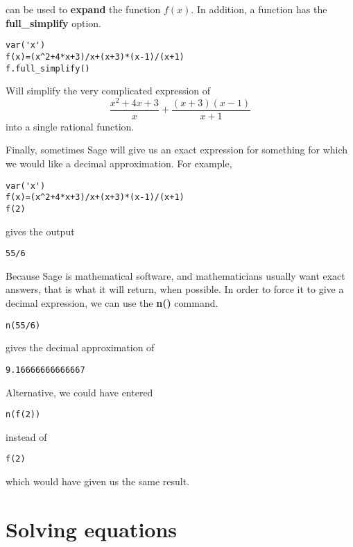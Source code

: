 can be used to \textbf{expand} the function $f(x)$. In addition,
a function has the \textbf{full\_simplify} option.

\begin{verbatim}
var('x')
f(x)=(x^2+4*x+3)/x+(x+3)*(x-1)/(x+1)
f.full_simplify()
\end{verbatim}

Will simplify the very complicated expression of
\begin{equation*}
	\frac{x^2+4x+3}{x} + \frac{(x+3)(x-1)}{x+1}
\end{equation*}
into a single rational function.

Finally, sometimes Sage will give us an exact expression for
something for which we would like a decimal approximation.
For example, 

\begin{verbatim}
var('x')
f(x)=(x^2+4*x+3)/x+(x+3)*(x-1)/(x+1)
f(2)
\end{verbatim}

gives the output

\begin{verbatim}
55/6
\end{verbatim}

Because Sage is mathematical software, and mathematicians usually
want exact answers, that is what it will return, when possible. In order
to force it to give a decimal expression, we can use the
\textbf{n()} command.

\begin{verbatim}
n(55/6)
\end{verbatim}

gives the decimal approximation of

\begin{verbatim}
9.16666666666667
\end{verbatim}

Alternative, we could have entered

\begin{verbatim}
n(f(2))
\end{verbatim}

instead of 

\begin{verbatim}
f(2)
\end{verbatim}

which would have given us the same result.

\section{Solving equations}

